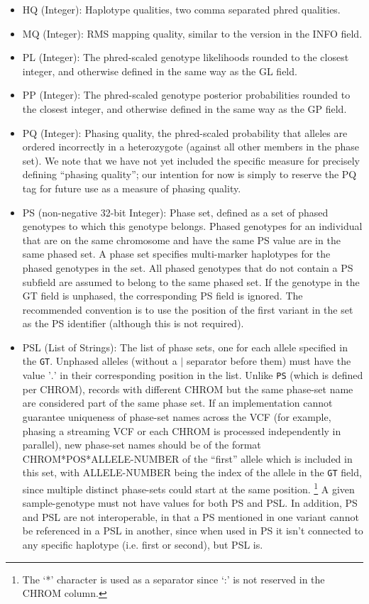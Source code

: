 \documentclass[8pt]{article}
\begin{document}
\begin{itemize}
  \item HQ (Integer): Haplotype qualities, two comma separated phred qualities.
  \item MQ (Integer): RMS mapping quality, similar to the version in the INFO field.
  \item PL (Integer): The phred-scaled genotype likelihoods rounded to the closest integer, and otherwise defined in the same way as the GL field.
  \item PP (Integer): The phred-scaled genotype posterior probabilities rounded to the closest integer, and otherwise defined in the same way as the GP field.
  \item PQ (Integer): Phasing quality, the phred-scaled probability that alleles are ordered incorrectly in a heterozygote (against all other members in the phase set).
  We note that we have not yet included the specific measure for precisely defining ``phasing quality''; our intention for now is simply to reserve the PQ tag for future use as a measure of phasing quality.
  \item PS (non-negative 32-bit Integer): Phase set, defined as a set of phased genotypes to which this genotype belongs.
  Phased genotypes for an individual that are on the same chromosome and have the same PS value are in the same phased set.
  A phase set specifies multi-marker haplotypes for the phased genotypes in the set.
  All phased genotypes that do not contain a PS subfield are assumed to belong to the same phased set.
  If the genotype in the GT field is unphased, the corresponding PS field is ignored.
  The recommended convention is to use the position of the first variant in the set as the PS identifier (although this is not required).
  \item PSL (List of Strings): The list of phase sets, one for each allele specified in the {\tt GT}. 
  Unphased alleles (without a $\mid$ separator before them) must have the value '$.$' in their corresponding position in the list.
  Unlike {\tt PS} (which is defined per CHROM), records with different CHROM but the same phase-set name are considered part of the same phase set.
  If an implementation cannot guarantee uniqueness of phase-set names across the VCF (for example, phasing a streaming VCF or each CHROM is processed independently in parallel), new phase-set names should be of the format CHROM*POS*ALLELE-NUMBER of the ``first'' allele which is included in this set, with ALLELE-NUMBER being the index of the allele in the {\tt GT} field, since multiple distinct phase-sets could start at the same position. \footnote{The `*' character is used as a separator since `:' is not reserved in the CHROM column.}
  A given sample-genotype must not have values for both PS and PSL.
  In addition, PS and PSL are not interoperable, in that a PS mentioned in one variant cannot be referenced in a PSL in another,  since when used in PS it isn't connected to any specific haplotype (i.e. first or second), but PSL is. 
 

\end{itemize}
\end{document}
